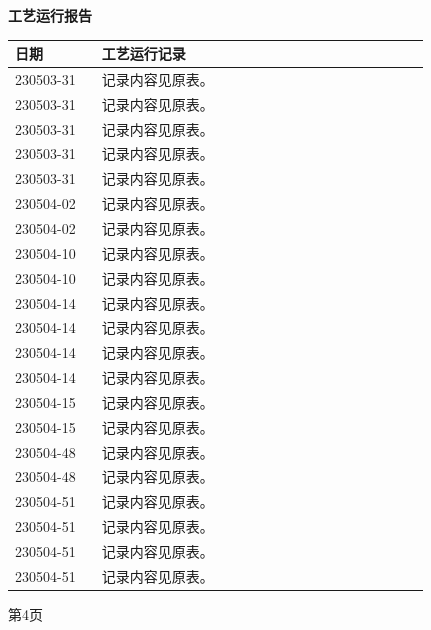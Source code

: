 \documentclass[UTF8,10pt,a4paper,fontset=fandol]{ctexart}
\begin{document}

\begin{center}
\textbf{工艺运行报告}

\vspace{0.5em}
\small
\begin{tabular}{|p{0.18\linewidth}|p{0.68\linewidth}|}
\hline
\textbf{日期} & \textbf{工艺运行记录} \\
\hline
230503-31 & 记录内容见原表。 \\
\hline
230503-31 & 记录内容见原表。 \\
\hline
230503-31 & 记录内容见原表。 \\
\hline
230503-31 & 记录内容见原表。 \\
\hline
230503-31 & 记录内容见原表。 \\
\hline
230504-02 & 记录内容见原表。 \\
\hline
230504-02 & 记录内容见原表。 \\
\hline
230504-10 & 记录内容见原表。 \\
\hline
230504-10 & 记录内容见原表。 \\
\hline
230504-14 & 记录内容见原表。 \\
\hline
230504-14 & 记录内容见原表。 \\
\hline
230504-14 & 记录内容见原表。 \\
\hline
230504-14 & 记录内容见原表。 \\
\hline
230504-15 & 记录内容见原表。 \\
\hline
230504-15 & 记录内容见原表。 \\
\hline
230504-48 & 记录内容见原表。 \\
\hline
230504-48 & 记录内容见原表。 \\
\hline
230504-51 & 记录内容见原表。 \\
\hline
230504-51 & 记录内容见原表。 \\
\hline
230504-51 & 记录内容见原表。 \\
\hline
230504-51 & 记录内容见原表。 \\
\hline
\end{tabular}

\vspace{0.5em}

第4页
\end{center}

\end{document}
